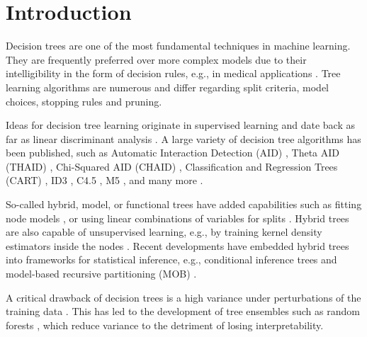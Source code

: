 \documentclass[a4paper, 11pt]{article}
\begin{document}
\section{Introduction}

Decision trees are one of the most fundamental techniques in machine learning. They are frequently preferred over more complex models due to their intelligibility in the form of decision rules, e.g., in medical applications \cite{podgorelec_trees_medicine}. Tree learning algorithms are numerous and differ regarding split criteria, model choices, stopping rules and pruning. \par
Ideas for decision tree learning originate in supervised learning and date back as far as linear discriminant analysis \cite{fisher_lda}. A large variety of decision tree algorithms has been published, such as Automatic Interaction Detection (AID) \cite{hawkins_AID}, Theta AID (THAID) \cite{ messenger_mandell_thaid}, Chi-Squared AID (CHAID) \cite{kass_chaid}, Classification and Regression Trees (CART) \cite{cart_1, hastie_elemstatlearn}, ID3 \cite{quinlan_induction}, C4.5 \cite{quinlan_c45}, M5 \cite{quinlan_m5}, and many more \cite{loh_trees_review}.
\par
So-called hybrid, model, or functional trees \cite{zeileis_mob} have added capabilities such as fitting node models \cite{quinlan_model_tree}, or using linear combinations of variables for splits \cite{brodley_multivariate_trees}. Hybrid trees are also capable of unsupervised learning, e.g., by training kernel density estimators inside the nodes \cite{ram_density_estimation_tree}.
Recent developments have embedded hybrid trees into frameworks for  statistical inference, e.g., conditional inference trees \cite{hothorn_ctree} and model-based recursive partitioning (MOB) \cite{zeileis_mob}.
\par
A critical drawback of decision trees is a high variance under perturbations of the training data \cite{hastie_elemstatlearn}. This has led to the development of tree ensembles such as random forests \cite{breiman_randomforests}, which reduce variance to the detriment of losing interpretability.

\par
\end{document}
